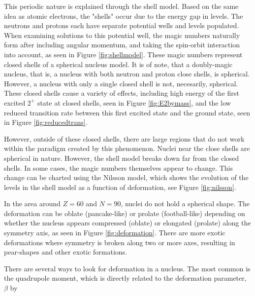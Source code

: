 This periodic nature is explained through the shell model. Based on the same idea as atomic electrons, the "shells" occur due to the energy gap in levels. The neutrons and protons each have separate potential wells and levels populated. When examining solutions to this potential well, the magic numbers naturally form after including angular momentum, and taking the spin-orbit interaction into account, as seen in Figure \ref{fig:shellmodel}. These magic numbers represent closed shells of a spherical nucleus model. It is of note, that a doubly-magic nucleus, that is, a nucleus with both neutron and proton close shells, is spherical. However, a nucleus with only a single closed shell is not, necesarily, spherical. These closed shells cause a variety of effects, including high energy of the first excited $2^+$ state at closed shells, seen in Figure \ref{fig:E2bymass}, and the low reduced transition rate between this first excited state and the ground state, seen in Figure \ref{fig:reducedtrans}.







However, outside of these closed shells, there are large regions that do not work within the paradigm created by this phenomenon. Nuclei near the close shells are spherical in nature. However, the shell model breaks down far from the closed shells. In some cases, the magic numbers themselves appear to change. This change can be charted using the Nilsson model, which shows the evolution of the levels in the shell model as a function of deformation, see Figure \ref{fig:nilsson}.



In the area around $Z=60$ and $N=90$, nuclei do not hold a spherical shape. The deformation can be oblate (pancake-like) or prolate (football-like) depending on whether the nucleus appears compressed (oblate) or elongated (prolate) along the symmetry axis, as seen in Figure \ref{fig:deformation}. There are more exotic deformations where symmetry is broken along two or more axes, resulting in pear-shapes and other exotic formations.



There are several ways to look for deformation in a nucleus. The most common is the quadrupole moment, which is directly related to the deformation parameter, $\beta$ by

